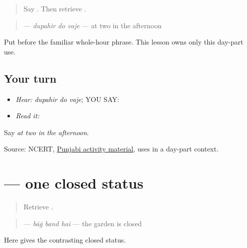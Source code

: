 \label{lesson:PA-C179-dupahir}



\begin{quote}
Say \textbf{}. Then retrieve \textbf{   }.
\end{quote}

\begin{grammarlens}[title={Grammar Lens: afternoon precedes the hour}]
\begin{quote}
\textbf{  } — \emph{dupahir do vaje} — at two in the afternoon
\end{quote}

Put \textbf{} before the familiar whole-hour phrase. This lesson owns only this day-part use.
\end{grammarlens}

\subsection*{Your turn}
\begin{itemize}
\raggedright
  \item \emph{Hear:} \emph{dupahir do vaje}; YOU SAY: \textbf{  }
  \item \emph{Read it:} \textbf{  }
\end{itemize}

\begin{tcolorbox}[breakable,colback=teal!4,colframe=teal!35!black,title={Before you move on}]
Say \emph{at two in the afternoon}.

Source: NCERT, \href{https://www.ncertbooks.net/textbook/pdf/bmnjm109.pdf}{Punjabi activity material}, uses \textbf{} in a day-part context.
\end{tcolorbox}
\section[\texorpdfstring{\pa{ਬਾਗ਼} \pa{ਬੰਦ} \pa{ਹੈ} (baagh band hai)}{ਬਾਗ਼ ਬੰਦ ਹੈ (baagh band hai)}]{   — one closed status}

\label{lesson:PA-C179-band}



\begin{quote}
Retrieve \textbf{   }.
\end{quote}

\begin{grammarlens}[title={Grammar Lens: one closed status}]
\begin{quote}
\textbf{  } — \emph{bāġ band hai} — the garden is closed
\end{quote}

Here \textbf{} gives the contrasting closed status.
\end{grammarlens}

